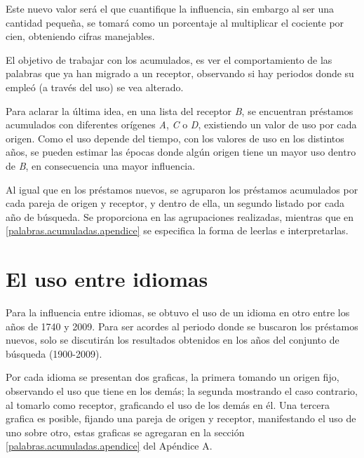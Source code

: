 \begin{enumerate}
	Este  nuevo valor será el que cuantifique la influencia, sin embargo al ser una cantidad pequeña, se tomará como un porcentaje al multiplicar el cociente por cien, obteniendo cifras manejables. 
	
	
	
\end{enumerate}

El objetivo de trabajar con los acumulados, es ver el comportamiento de las palabras que ya han migrado a un receptor, observando si hay periodos donde su empleó (a través del uso) se vea alterado. 

Para aclarar la última idea, en una lista del receptor \textit{B}, se encuentran  préstamos acumulados con diferentes orígenes \textit{A}, \textit{C} o \textit{D}, existiendo un valor de uso por cada origen. Como el uso depende del tiempo, con los valores de uso en los distintos años, se pueden estimar las épocas donde algún origen tiene un mayor uso dentro de \textit{B},  en consecuencia una mayor influencia. 

Al igual que en los préstamos nuevos,  se agruparon los préstamos acumulados por cada pareja de origen y receptor,  y dentro de ella, un segundo listado por cada año de búsqueda.  Se proporciona en \cite{prestamos_acumulados} las agrupaciones realizadas, mientras que en \ref{palabras.acumuladas.apendice} se especifica la forma de leerlas e interpretarlas. 



\section {El uso entre idiomas} 

Para la influencia entre idiomas, se obtuvo el uso de un idioma en otro entre los años de 1740 y 2009. Para ser acordes al periodo donde se buscaron los préstamos nuevos, solo se discutirán los resultados obtenidos en los años del conjunto de búsqueda (1900-2009).


Por cada idioma se presentan dos graficas, la primera tomando un origen fijo, observando el uso que tiene en los demás; la segunda mostrando el caso contrario, al tomarlo como receptor, graficando el uso de los demás en él.  Una tercera grafica es posible, fijando una pareja de origen y receptor, manifestando el uso de uno sobre otro,  estas graficas se agregaran en la sección \ref{palabras.acumuladas.apendice} del Apéndice A.

